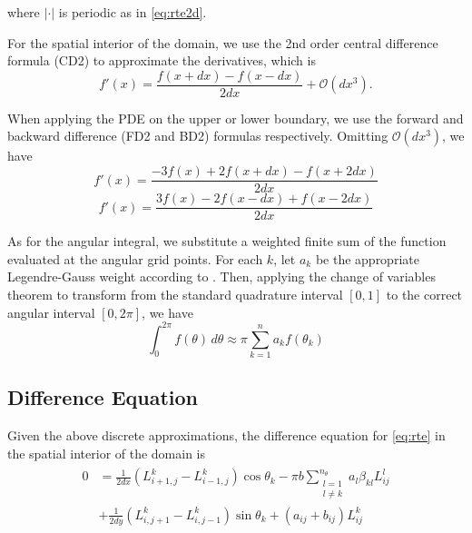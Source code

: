 \documentclass[10pt]{article}
\newcommand\abs[1]{\left| #1 \right|}
\begin{document}
\begin{multicols}{2}
where $\abs{\cdot}$ is periodic as in \eqref{eq:rte2d}.

For the spatial interior of the domain, we use the 2nd order central difference formula (CD2) to approximate the derivatives, which is
\begin{equation}
    \tag{CD2}
    f'(x) = \frac{f(x+dx)-f(x-dx)}{2dx} + \mathcal{O}(dx^3).
\end{equation}

When applying the PDE on the upper or lower boundary, we use the forward and backward difference (FD2 and BD2) formulas respectively.
Omitting $\mathcal{O}(dx^3)$, we have
\begin{equation}
    \tag{FD2}
    \label{eq:FD2}
    f'(x) = \frac{-3f(x)+2f(x+dx)-f(x+2dx)}{2dx}
\end{equation}
\begin{equation}
    \tag{BD2}
    \label{eq:BD2}
    f'(x) = \frac{3f(x)-2f(x-dx)+f(x-2dx)}{2dx}
\end{equation}

As for the angular integral, we substitute a weighted finite sum of the function evaluated at the angular grid points.
For each $k$, let $a_k$ be the appropriate Legendre-Gauss weight according to \citet[Chapter 2]{chandrasekhar_radiative_1960}.
Then, applying the change of variables theorem to transform from the standard quadrature interval $[0,1]$ to the correct angular interval $[0,2\pi]$, we have
\begin{equation}
    \tag{LG}
    \int_0^{2\pi} f(\theta)\,d\theta \approx \pi\sum_{k=1}^n a_k f(\theta_k)
\end{equation}

\subsection{Difference Equation}
Given the above discrete approximations, the difference equation for \eqref{eq:rte} in the spatial interior of the domain is
\begin{align}
    \label{eq:diffeq}
    \begin{split}
    0 &= \frac{1}{2dx}\left(L_{i+1,j}^k - L_{i-1,j}^k\right) \cos\theta_k
    - \pi b \sum_{\substack{l=1\\ l\neq k}}^{n_\theta} a_l\beta_{kl}L_{ij}^l \\
    &+ \frac{1}{2dy}\left(L_{i,j+1}^k - L_{i,j-1}^k\right) \sin\theta_k
    + (a_{ij} + b_{ij})L_{ij}^k
    \end{split}
\end{align}


\end{multicols}
\end{document}
